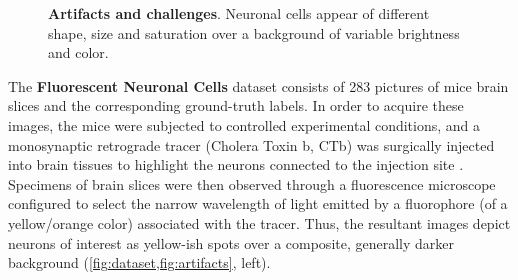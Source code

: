 \begin{figure}
\begin{subfigure}{1.1\textwidth}
\label{fig:artifacts:macaroon}
\end{subfigure}
\vspace{-0.2cm}
\caption{
\textbf{Artifacts and challenges}. Neuronal cells appear of different shape, size and saturation over a background of variable brightness and color.
} 
\label{fig:artifacts}
\end{figure}

The \textbf{Fluorescent Neuronal Cells} dataset \cite{clissa2021fluocells} consists of 283 
pictures 
of mice brain slices and the corresponding ground-truth labels.
In order to acquire these images, the mice were subjected to controlled experimental conditions, and a monosynaptic retrograde tracer (Cholera Toxin b, CTb) was surgically injected into brain tissues to highlight the neurons connected to the injection site
\cite{hitrec2019neural}.
Specimens of brain slices were then observed through  
a fluorescence microscope configured to select the narrow wavelength of light emitted by 
a fluorophore (of a yellow/orange color) associated with the tracer.
Thus, the resultant images depict neurons of interest as
yellow-ish spots
over a composite, generally darker background (\cref{fig:dataset,fig:artifacts}, left).

